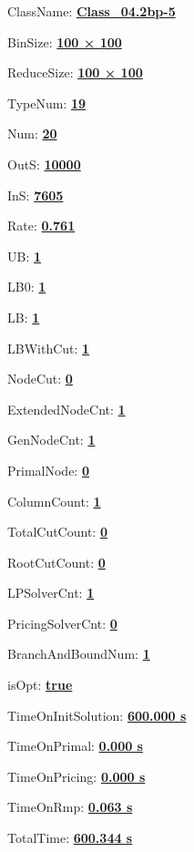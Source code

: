 \documentclass[11pt]{article}
\begin{document}
\pagestyle{empty}


ClassName: \underline{\textbf{Class_04.2bp-5}}
\par
BinSize: \underline{\textbf{100 × 100}}
\par
ReduceSize: \underline{\textbf{100 × 100}}
\par
TypeNum: \underline{\textbf{19}}
\par
Num: \underline{\textbf{20}}
\par
OutS: \underline{\textbf{10000}}
\par
InS: \underline{\textbf{7605}}
\par
Rate: \underline{\textbf{0.761}}
\par
UB: \underline{\textbf{1}}
\par
LB0: \underline{\textbf{1}}
\par
LB: \underline{\textbf{1}}
\par
LBWithCut: \underline{\textbf{1}}
\par
NodeCut: \underline{\textbf{0}}
\par
ExtendedNodeCnt: \underline{\textbf{1}}
\par
GenNodeCnt: \underline{\textbf{1}}
\par
PrimalNode: \underline{\textbf{0}}
\par
ColumnCount: \underline{\textbf{1}}
\par
TotalCutCount: \underline{\textbf{0}}
\par
RootCutCount: \underline{\textbf{0}}
\par
LPSolverCnt: \underline{\textbf{1}}
\par
PricingSolverCnt: \underline{\textbf{0}}
\par
BranchAndBoundNum: \underline{\textbf{1}}
\par
isOpt: \underline{\textbf{true}}
\par
TimeOnInitSolution: \underline{\textbf{600.000 s}}
\par
TimeOnPrimal: \underline{\textbf{0.000 s}}
\par
TimeOnPricing: \underline{\textbf{0.000 s}}
\par
TimeOnRmp: \underline{\textbf{0.063 s}}
\par
TotalTime: \underline{\textbf{600.344 s}}
\par
\newpage
\end{document}
